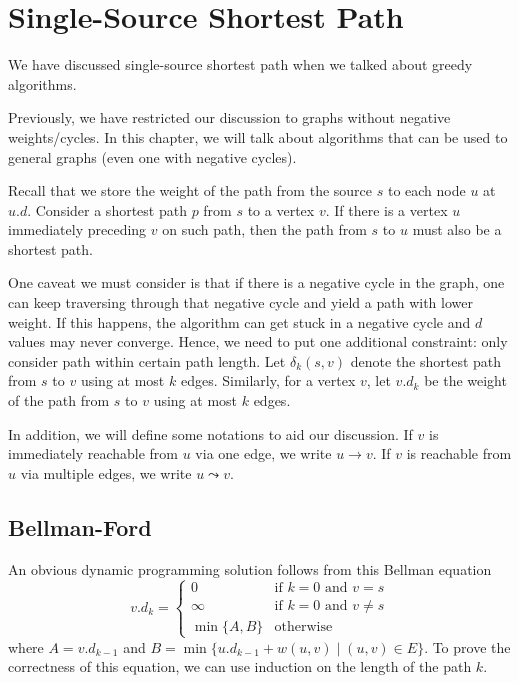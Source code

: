 \section{Single-Source Shortest Path}

We have discussed single-source shortest path when we talked about greedy algorithms.

Previously, we have restricted our discussion to graphs without negative weights/cycles. In this chapter, we will talk about algorithms that can be used to general graphs (even one with negative cycles). 

Recall that we store the weight of the path from the source $s$ to each node $u$ at $u.d$. Consider a shortest path $p$ from $s$ to a vertex $v$. If there is a vertex $u$ immediately preceding $v$ on such path, then the path from $s$ to $u$ must also be a shortest path.

One caveat we must consider is that if there is a negative cycle in the graph, one can keep traversing through that negative cycle and yield a path with lower weight. If this happens, the algorithm can get stuck in a negative cycle and $d$ values may never converge. Hence, we need to put one additional constraint: only consider path within certain path length. Let $\delta_k(s,v)$ denote the shortest path from $s$ to $v$ using at most $k$ edges. Similarly, for a vertex $v$, let $v.d_k$ be the weight of the path from $s$ to $v$ using at most $k$ edges.

In addition, we will define some notations to aid our discussion. If $v$ is immediately reachable from $u$ via one edge, we write $u \to v$. If $v$ is reachable from $u$ via multiple edges, we write $u \leadsto v$.

\subsection{Bellman-Ford} 

An obvious dynamic programming solution follows from this Bellman equation
$$
v.d_k = \begin{cases}
    0 & \text{if $k=0$ and $v=s$} \\
    \infty & \text{if $k=0$ and $v \neq s$} \\
    \min\{A,B\} & \text{otherwise}
\end{cases}
$$
where $A = v.d_{k-1}$ and $B = \min\{u.d_{k-1} + w(u,v) \mid (u,v) \in E \}$.
To prove the correctness of this equation, we can use induction on the length of the path $k$.

